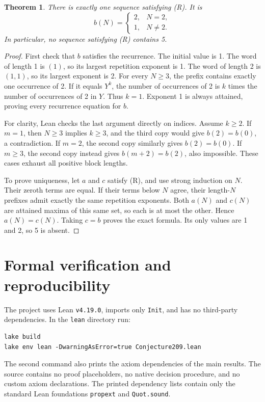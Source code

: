 \documentclass[11pt,a4paper]{article}
\newtheorem{theorem}{Theorem}
\begin{document}
\begin{theorem}
There is exactly one sequence satisfying (R). It is
\[
 b(N)=\begin{cases}2,&N=2,\\1,&N\ne2.\end{cases}
\]
In particular, no sequence satisfying (R) contains 5.
\end{theorem}

\begin{proof}
First check that $b$ satisfies the recurrence. The initial value is 1.
The word of length 1 is $(1)$, so its largest repetition exponent is 1.
The word of length 2 is $(1,1)$, so its largest exponent is 2.
For every $N\geq3$, the prefix contains exactly one occurrence of 2.
If it equals $Y^k$, the number of occurrences of 2 is
$k$ times the number of occurrences of 2 in $Y$. Thus $k=1$.
Exponent 1 is always attained, proving every recurrence equation for $b$.

For clarity, Lean checks the last argument directly on indices.
Assume $k\geq2$. If $m=1$, then $N\geq3$ implies $k\geq3$, and the
third copy would give $b(2)=b(0)$, a contradiction.
If $m=2$, the second copy similarly gives $b(2)=b(0)$.
If $m\geq3$, the second copy instead gives $b(m+2)=b(2)$, also impossible.
These cases exhaust all positive block lengths.

To prove uniqueness, let $a$ and $c$ satisfy (R), and use strong induction
on $N$. Their zeroth terms are equal. If their terms below $N$ agree,
their length-$N$ prefixes admit exactly the same repetition exponents.
Both $a(N)$ and $c(N)$ are attained maxima of this same set, so each is
at most the other. Hence $a(N)=c(N)$. Taking $c=b$ proves the exact formula.
Its only values are 1 and 2, so 5 is absent.
\end{proof}

\section{Formal verification and reproducibility}
The project uses Lean \texttt{v4.19.0}, imports only \texttt{Init}, and has
no third-party dependencies. In the \texttt{lean} directory run:
\begin{verbatim}
lake build
lake env lean -DwarningAsError=true Conjecture209.lean
\end{verbatim}
The second command also prints the axiom dependencies of the main results.
The source contains no proof placeholders, no native decision procedure,
and no custom axiom declarations. The printed dependency lists contain
only the standard Lean foundations \texttt{propext} and \texttt{Quot.sound}.
\end{document}
